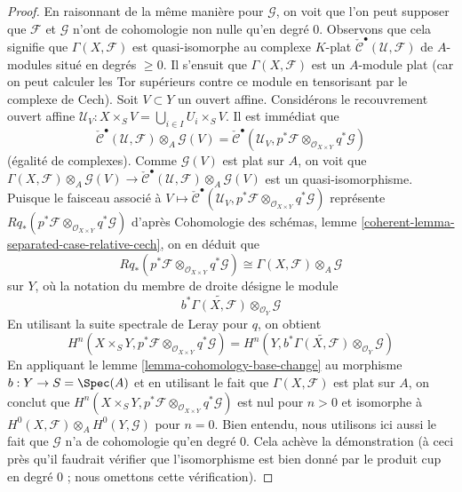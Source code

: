 \begin{proof}
\medskip\noindent
En raisonnant de la même manière pour $\mathcal{G}$, on voit que l'on
peut supposer que $\mathcal{F}$ et $\mathcal{G}$
n'ont de cohomologie non nulle qu'en degré $0$.
Observons que cela signifie que $\Gamma(X, \mathcal{F})$
est quasi-isomorphe au complexe $K$-plat
$\check{\mathcal{C}}^\bullet(\mathcal{U}, \mathcal{F})$
de $A$-modules situé en degrés $\geq 0$.
Il s'ensuit que $\Gamma(X, \mathcal{F})$ est un $A$-module plat
(car on peut calculer les Tor supérieurs contre ce module
en tensorisant par le complexe de Cech).
Soit $V \subset Y$ un ouvert affine. Considérons le recouvrement ouvert affine
$\mathcal{U}_V : X \times_S V = \bigcup_{i \in I} U_i \times_S V$.
Il est immédiat que
$$
\check{\mathcal{C}}^\bullet(\mathcal{U}, \mathcal{F})
\otimes_A \mathcal{G}(V) =
\check{\mathcal{C}}^\bullet(\mathcal{U}_V,
p^*\mathcal{F} \otimes_{\mathcal{O}_{X \times Y}}
q^*\mathcal{G})
$$
(égalité de complexes). Comme $\mathcal{G}(V)$ est plat
sur $A$, on voit que
$\Gamma(X, \mathcal{F}) \otimes_A \mathcal{G}(V) \to
\check{\mathcal{C}}^\bullet(\mathcal{U}, \mathcal{F})
\otimes_A \mathcal{G}(V)$ est un quasi-isomorphisme.
Puisque le faisceau associé à
$V \mapsto \check{\mathcal{C}}^\bullet(\mathcal{U}_V,
p^*\mathcal{F} \otimes_{\mathcal{O}_{X \times Y}}
q^*\mathcal{G})$ représente
$Rq_*(p^*\mathcal{F} \otimes_{\mathcal{O}_{X \times Y}} q^*\mathcal{G})$
d'après Cohomologie des schémas, lemme
\ref{coherent-lemma-separated-case-relative-cech},
on en déduit que
$$
Rq_*(p^*\mathcal{F} \otimes_{\mathcal{O}_{X \times Y}} q^*\mathcal{G})
\cong
\Gamma(X, \mathcal{F}) \otimes_A \mathcal{G}
$$
sur $Y$, où la notation du membre de droite désigne le module
$$
b^*\widetilde{\Gamma(X, \mathcal{F})} \otimes_{\mathcal{O}_Y} \mathcal{G}
$$
En utilisant la suite spectrale de Leray pour $q$, on obtient
$$
H^n(X \times_S Y, p^*\mathcal{F} \otimes_{\mathcal{O}_{X \times Y}}
q^*\mathcal{G}) =
H^n(Y,
b^*\widetilde{\Gamma(X, \mathcal{F})} \otimes_{\mathcal{O}_Y} \mathcal{G})
$$
En appliquant le lemme \ref{lemma-cohomology-base-change} au morphisme
$b : Y \to S = \Spec(A)$ et en utilisant le fait que $\Gamma(X, \mathcal{F})$
est plat sur $A$, on conclut que
$H^n(X \times_S Y, p^*\mathcal{F} \otimes_{\mathcal{O}_{X \times Y}}
q^*\mathcal{G})$ est nul pour $n > 0$ et isomorphe à
$H^0(X, \mathcal{F}) \otimes_A H^0(Y, \mathcal{G})$ pour $n = 0$.
Bien entendu, nous utilisons ici aussi le fait que $\mathcal{G}$ n'a de
cohomologie qu'en degré $0$.
Cela achève la démonstration (à ceci près qu'il faudrait vérifier que
l'isomorphisme est bien donné par le produit cup en degré $0$ ; nous omettons
cette vérification).
\end{proof}

